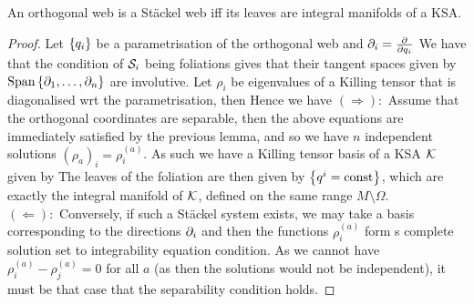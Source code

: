 \documentclass{article}
\begin{document}
\begin{prop}
An orthogonal web is a St\"ackel web iff its leaves are integral manifolds of a KSA.
\end{prop}
\begin{proof}
Let $\left\{ q_i \right\}$ be a parametrisation of the orthogonal web and $\partial_i = \frac{\partial}{\partial q_i}$ We have that the condition of $\mathcal{S}_i$ being foliations gives that their tangent spaces given by $\operatorname{Span}\left\{ \partial_1, \dots, \partial_n \right\}$ are involutive. Let $\rho_i$ be eigenvalues of a Killing tensor that is diagonalised wrt the parametrisation, then  
Hence we have 
$(\Rightarrow):$ Assume that the orthogonal coordinates are separable, then the above equations are immediately satisfied by the previous lemma, and so we have $n$ independent solutions $(\rho_a)_i = \rho_i^{(a)}$. As such we have a Killing tensor basis of a KSA $\mathcal{K}$ given by 
The leaves of the foliation are then given by $\left\{ q^i = \text{const} \right\}$, which are exactly the integral manifold of $\mathcal{K}$, defined on the same range $M \setminus \Omega$. \\
$(\Leftarrow):$ Conversely, if such a St\"ackel system exists,  we may take a basis corresponding to the directions $\partial_i$ and then the functions $\rho_i^{(a)}$ form s complete solution set to integrability equation condition. As we cannot have $\rho_i^{(a)} - \rho_j^{(a)} = 0$ for all $a$ (as then the solutions would not be independent), it must be that case that the separability condition holds. 
\end{proof}
\end{document}
